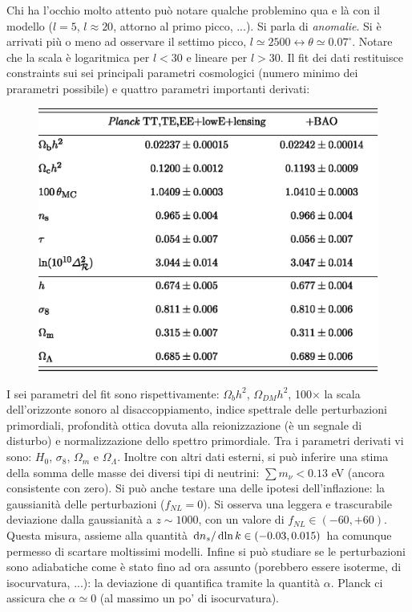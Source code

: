 \vspace{1em}
Chi ha l'occhio molto attento può notare qualche problemino qua e là con il modello ($l=5$, $l\approx 20$, attorno al primo picco, ...). Si parla di \textit{anomalie}. Si è arrivati più o meno ad osservare il settimo picco, $l\simeq 2500 \leftrightarrow \theta \simeq 0.07^\circ$. Notare che la scala è logaritmica per $l<30$ e lineare per $l>30$. Il fit dei dati restituisce constraints sui sei principali parametri cosmologici (numero minimo dei prarametri possibile) e quattro parametri importanti derivati:
\begin{figure}[H]
    \centering
    \includegraphics[width=0.65 \textwidth]{Pictures/11/planktable.eps}
\end{figure}
I sei parametri del fit sono rispettivamente: $\Omega_b h^2$, $\Omega_{DM} h^2$, 100$\times$ la scala dell'orizzonte sonoro al disaccoppiamento, indice spettrale delle perturbazioni primordiali, profondità ottica dovuta alla reionizzazione (è un segnale di disturbo) e normalizzazione dello spettro primordiale. Tra i parametri derivati vi sono: $H_0$, $\sigma_8$, $\Omega_m$ e $\Omega_\Lambda$. Inoltre con altri dati esterni, si può inferire una stima della somma delle masse dei diversi tipi di neutrini: $\sum m_\nu <0.13$ eV (ancora consistente con zero). Si può anche testare una delle ipotesi dell'inflazione: la gaussianità delle perturbazioni ($f_{NL}=0$). Si osserva una leggera e trascurabile deviazione dalla gaussianità a $z\sim 1000$, con un valore di $f_{NL}\in(-60,+60)$. Questa misura, assieme alla quantità $\operatorname{d}\!{n_s}/\operatorname{d}\!{\ln k}\in (-0.03, 0.015)$ ha comunque permesso di scartare moltissimi modelli. Infine si può studiare se le perturbazioni sono adiabatiche come è stato fino ad ora assunto (porebbero essere isoterme, di isocurvatura, ...): la deviazione di quantifica tramite la quantità $\alpha$. Planck ci assicura che $\alpha \simeq 0$ (al massimo un po' di isocurvatura). 

